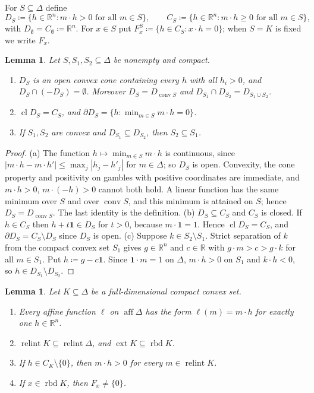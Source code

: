 \documentclass[11pt]{article}
\newcommand{\R}{\mathbb{R}}
\newcommand{\one}{\mathbf{1}}
\DeclareMathOperator{\conv}{conv}
\DeclareMathOperator{\relint}{relint}
\DeclareMathOperator{\rbd}{rbd}
\DeclareMathOperator{\aff}{aff}
\DeclareMathOperator{\ext}{ext}
\DeclareMathOperator{\cl}{cl}
\theoremstyle{plain}
\newtheorem{lemma}[theorem]{Lemma}
\theoremstyle{definition}
\theoremstyle{remark}
\begin{document}
For $S\subseteq\Delta$ define
\[
  D_S\coloneqq\{h\in\R^n: m\cdot h>0\text{ for all }m\in S\},\qquad
  C_S\coloneqq\{h\in\R^n: m\cdot h\ge0\text{ for all }m\in S\},
\]
with $D_\emptyset=C_\emptyset\coloneqq\R^n$. For $x\in S$ put $F^S_x\coloneqq\{h\in
C_S:x\cdot h=0\}$; when $S=K$ is fixed we write $F_x$.

\begin{lemma}\label{lem:D}
Let $S,S_1,S_2\subseteq\Delta$ be nonempty and compact.
\begin{enumerate}[label=(\alph*)]
  \item $D_S$ is an open convex cone containing every $h$ with all $h_i>0$, and
  $D_S\cap(-D_S)=\emptyset$. Moreover $D_S=D_{\conv S}$ and $D_{S_1}\cap D_{S_2}
  =D_{S_1\cup S_2}$.
  \item $\cl D_S=C_S$, and $\partial D_S=\{h:\min_{m\in S}m\cdot h=0\}$.
  \item If $S_1,S_2$ are convex and $D_{S_1}\subseteq D_{S_2}$, then $S_2\subseteq S_1$.
\end{enumerate}
\end{lemma}

\begin{proof}
(a) The function $h\mapsto\min_{m\in S}m\cdot h$ is continuous, since $|m\cdot h-m\cdot
h'|\le\max_j|h_j-h'_j|$ for $m\in\Delta$; so $D_S$ is open. Convexity, the cone property
and positivity on gambles with positive coordinates are immediate, and $m\cdot h>0$,
$m\cdot(-h)>0$ cannot both hold. A linear function has the same minimum over $S$ and
over $\conv S$, and this minimum is attained on $S$; hence $D_S=D_{\conv S}$. The last
identity is the definition.
(b) $D_S\subseteq C_S$ and $C_S$ is closed. If $h\in C_S$ then $h+t\one\in D_S$ for
$t>0$, because $m\cdot\one=1$. Hence $\cl D_S=C_S$, and $\partial D_S=C_S\setminus D_S$
since $D_S$ is open.
(c) Suppose $k\in S_2\setminus S_1$. Strict separation of $k$ from the compact convex set
$S_1$ gives $g\in\R^n$ and $c\in\R$ with $g\cdot m>c>g\cdot k$ for all $m\in S_1$. Put
$h\coloneqq g-c\one$. Since $\one\cdot m=1$ on $\Delta$, $m\cdot h>0$ on $S_1$ and
$k\cdot h<0$, so $h\in D_{S_1}\setminus D_{S_2}$.
\end{proof}

\begin{lemma}\label{lem:fulldim}
Let $K\subseteq\Delta$ be a full-dimensional compact convex set.
\begin{enumerate}[label=(\alph*)]
  \item Every affine function $\ell$ on $\aff\Delta$ has the form $\ell(m)=m\cdot h$ for
  exactly one $h\in\R^n$.
  \item $\relint K\subseteq\relint\Delta$, and $\ext K\subseteq\rbd K$.
  \item If $h\in C_K\setminus\{0\}$, then $m\cdot h>0$ for every $m\in\relint K$.
  \item If $x\in\rbd K$, then $F_x\neq\{0\}$.
\end{enumerate}
\end{lemma}
\end{document}
